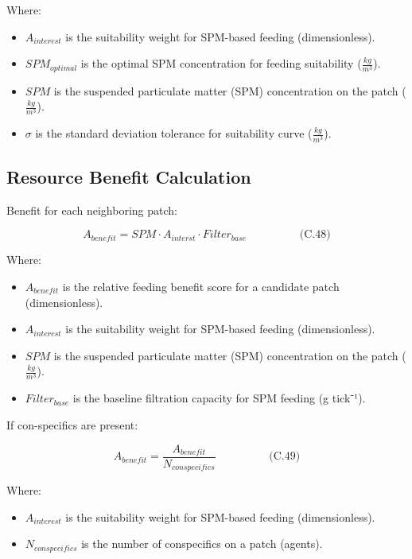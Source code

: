\documentclass[
]{book}
\providecommand{\tightlist}{%
  \setlength{\itemsep}{0pt}\setlength{\parskip}{0pt}}
\begin{document}
Where:

\begin{itemize}
\tightlist
\item
  \(A_{interest}\) is the suitability weight for SPM-based feeding
  (dimensionless).
\item
  \(SPM_{optimal}\) is the optimal SPM concentration for feeding
  suitability (\(\frac{kg}{m^3}\)).
\item
  \(SPM\) is the suspended particulate matter (SPM) concentration on the
  patch (\(\frac{kg}{m^3}\)).
\item
  \(\sigma\) is the standard deviation tolerance for suitability curve
  (\(\frac{kg}{m^3}\)).
\end{itemize}

\subsection{Resource Benefit Calculation}\label{resource-benefit-calculation}

Benefit for each neighboring patch:

\[
\begin{equation} A_{benefit} = SPM \cdot A_{interst} \cdot Filter_{base}  \hspace{2cm} \text{(C.48)} \end{equation}
\]

Where:

\begin{itemize}
\tightlist
\item
  \(A_{benefit}\) is the relative feeding benefit score for a candidate
  patch (dimensionless).
\item
  \(A_{interest}\) is the suitability weight for SPM-based feeding
  (dimensionless).
\item
  \(SPM\) is the suspended particulate matter (SPM) concentration on the
  patch (\(\frac{kg}{m^3}\)).
\item
  \(Filter_{base}\) is the baseline filtration capacity for SPM feeding
  (g tick⁻¹).
\end{itemize}

If con-specifics are present:

\[
\begin{equation} A_{benefit} = \frac{A_{benefit}}{N_{conspecifics}}  \hspace{2cm} \text{(C.49)} \end{equation}
\]

Where:

\begin{itemize}
\tightlist
\item
  \(A_{interest}\) is the suitability weight for SPM-based feeding
  (dimensionless).
\item
  \(N_{conspecifics}\) is the number of conspecifics on a patch
  (agents).
\end{itemize}
\end{document}

